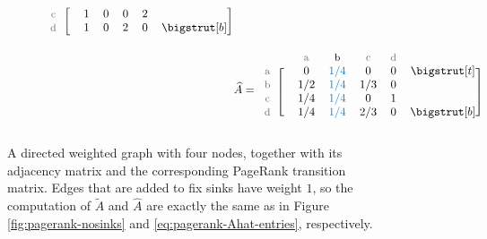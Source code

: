 \begin{figure}[H]
\begin{subfigure}{.45\textwidth}
\begin{align*}
\begin{blockarray}{ccccccc}
\begin{block}{c[cccccc]}
\small\text{\textcolor{gray}{c}} & & 1 & 0 & 0 & 2 & \\
\small\text{\textcolor{gray}{d}} & & 1 & 0 & 2 & 0 & \botstrut\\
\end{block}\end{blockarray}
\\
&\widehat{A} = \begin{blockarray}{ccccccc}
& & \small\text{\textcolor{gray}{a}} & \small\text{b} & \small\text{\textcolor{gray}{c}} & \small\text{\textcolor{gray}{d}} & \\
\begin{block}{c[cccccc]}
\small\text{\textcolor{gray}{a}} & & 0 & \textcolor{blue}{1/4} & 0 & 0 & \topstrut\\
\small\text{\textcolor{gray}{b}} & & 1/2 & \textcolor{blue}{1/4} & 1/3 & 0 & \\
\small\text{\textcolor{gray}{c}} & & 1/4 & \textcolor{blue}{1/4} & 0 & 1 & \\
\small\text{\textcolor{gray}{d}} & & 1/4 & \textcolor{blue}{1/4} & 2/3 & 0 & \botstrut\\
\end{block}\end{blockarray}
\end{align*}
\end{subfigure}
\caption{A directed weighted graph with four nodes, together with its adjacency matrix and the corresponding PageRank transition matrix.
Edges that are added to fix sinks have weight $1$, so the computation of $\widetilde{A}$ and $\widehat{A}$ are exactly the same as in Figure \ref{fig:pagerank-nosinks} and \eqref{eq:pagerank-Ahat-entries}, respectively.
}
\label{fig:pagerank-weighted}
\end{figure}

